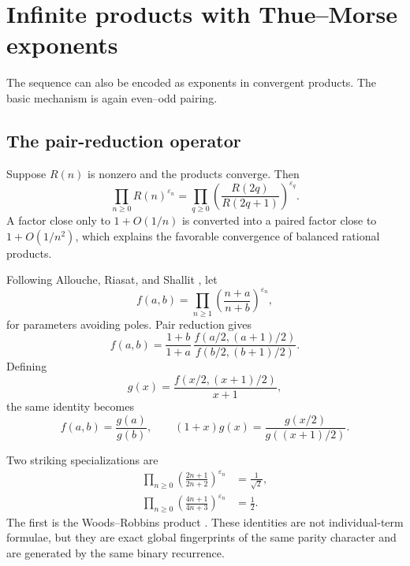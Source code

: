 \documentclass[11pt,oneside]{article}
\theoremstyle{definition}
\theoremstyle{remark}
\begin{document}
\section{Infinite products with Thue--Morse exponents}
\label{sec:infinite-products}

The sequence can also be encoded as exponents in convergent products.  The
basic mechanism is again even--odd pairing.

\subsection{The pair-reduction operator}

Suppose \(R(n)\) is nonzero and the products converge.  Then
\begin{equation}
 \prod_{n\ge0}R(n)^{\varepsilon_n}
 =\prod_{q\ge0}
   \left(\frac{R(2q)}{R(2q+1)}\right)^{\varepsilon_q}.
 \label{eq:product-pair-reduction}
\end{equation}
A factor close only to \(1+O(1/n)\) is converted into a paired factor close
to \(1+O(1/n^2)\), which explains the favorable convergence of balanced
rational products.

Following Allouche, Riasat, and Shallit \cite{alloucheRiasatShallit2017}, let
\begin{equation}
 f(a,b)=\prod_{n\ge1}\left(\frac{n+a}{n+b}\right)^{\varepsilon_n},
 \label{eq:f-product}
\end{equation}
for parameters avoiding poles.  Pair reduction gives
\begin{equation}
 f(a,b)
 =\frac{1+b}{1+a}\,
   \frac{f(a/2,(a+1)/2)}{f(b/2,(b+1)/2)}.
 \label{eq:f-reduction}
\end{equation}
Defining
\begin{equation}
 g(x)=\frac{f(x/2,(x+1)/2)}{x+1},
 \label{eq:g-def}
\end{equation}
the same identity becomes
\begin{equation}
 f(a,b)=\frac{g(a)}{g(b)},
 \qquad
 (1+x)g(x)=\frac{g(x/2)}{g((x+1)/2)}.
 \label{eq:g-functional}
\end{equation}

Two striking specializations are
\begin{align}
 \prod_{n\ge0}
  \left(\frac{2n+1}{2n+2}\right)^{\varepsilon_n}
 &=\frac{1}{\sqrt2},
 \label{eq:woods-robbins}\\
 \prod_{n\ge0}
  \left(\frac{4n+1}{4n+3}\right)^{\varepsilon_n}
 &=\frac12.
 \label{eq:quarter-product}
\end{align}
The first is the Woods--Robbins product \cite{woods1978,robbins1979}.  These
identities are not individual-term formulae, but they are exact global
fingerprints of the same parity character and are generated by the same
binary recurrence.
\end{document}
